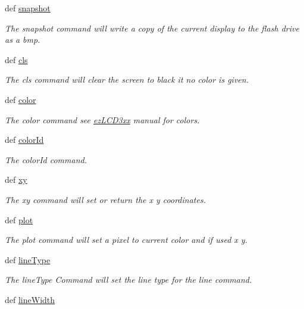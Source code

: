\begin{DoxyCompactItemize}
def \hyperlink{group___general_ga8a1ef000b3c71704260c9e5f949e80de}{snapshot}
\begin{DoxyCompactList}\small\item\em The snapshot command will write a copy of the current display to the flash drive as a bmp. \end{DoxyCompactList}\item 
def \hyperlink{group___drawing_gacdfb97b09494d0e3cec787014c4863f9}{cls}
\begin{DoxyCompactList}\small\item\em The cls command will clear the screen to black it no color is given. \end{DoxyCompactList}\item 
def \hyperlink{group___drawing_ga306a0e99b15bc1122683a1c6e18e7ef0}{color}
\begin{DoxyCompactList}\small\item\em The color command see \hyperlink{namespaceez_l_c_d3xx}{ez\-L\-C\-D3xx} manual for colors. \end{DoxyCompactList}\item 
def \hyperlink{group___drawing_ga94dd8d046a01670fc2212b548e29e8d0}{color\-Id}
\begin{DoxyCompactList}\small\item\em The color\-Id command. \end{DoxyCompactList}\item 
def \hyperlink{group___drawing_gaf249f02b6ad4e734ffa9d8371f6cab8a}{xy}
\begin{DoxyCompactList}\small\item\em The xy command will set or return the x y coordinates. \end{DoxyCompactList}\item 
def \hyperlink{group___drawing_gad3c0ce418a0feea4a0fa40f803c90196}{plot}
\begin{DoxyCompactList}\small\item\em The plot command will set a pixel to current color and if used x y. \end{DoxyCompactList}\item 
def \hyperlink{group___drawing_ga9dc821ce2652535899c584d4ff1c1bf7}{line\-Type}
\begin{DoxyCompactList}\small\item\em The line\-Type Command will set the line type for the line command. \end{DoxyCompactList}\item 
def \hyperlink{group___drawing_ga87b2625e7e4ffa927b4471003f8c6e70}{line\-Width}

\end{DoxyCompactItemize}
